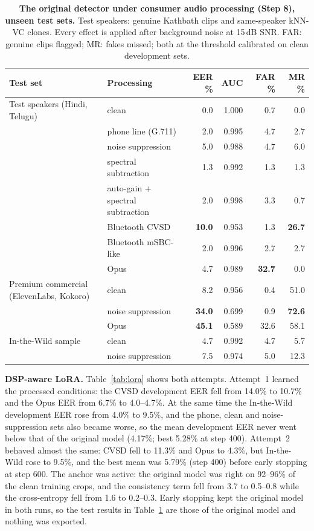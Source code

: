 \documentclass[10pt,a4paper,twocolumn]{article}
\begin{document}
\begin{table}[t]
\centering\small
\caption{\textbf{The original detector under consumer audio processing (Step 8), unseen test sets.} Test speakers: genuine Kathbath clips and same-speaker kNN-VC clones. Every effect is applied after background noise at 15\,dB SNR. FAR: genuine clips flagged; MR: fakes missed; both at the threshold calibrated on clean development sets.}
\label{tab:dsp}
\begin{tabular}{@{}llrrrr@{}}
\toprule
\textbf{Test set} & \textbf{Processing} & \textbf{EER \%} & \textbf{AUC} & \textbf{FAR \%} & \textbf{MR \%}\\
\midrule
Test speakers (Hindi, Telugu) & clean & 0.0 & 1.000 & 0.7 & 0.0\\
 & phone line (G.711) & 2.0 & 0.995 & 4.7 & 2.7\\
 & noise suppression & 5.0 & 0.988 & 4.7 & 6.0\\
 & spectral subtraction & 1.3 & 0.992 & 1.3 & 1.3\\
 & auto-gain + spectral subtraction & 2.0 & 0.998 & 3.3 & 0.7\\
 & Bluetooth CVSD & \textbf{10.0} & 0.953 & 1.3 & \textbf{26.7}\\
 & Bluetooth mSBC-like & 2.0 & 0.996 & 2.7 & 2.7\\
 & Opus & 4.7 & 0.989 & \textbf{32.7} & 0.0\\
\midrule
Premium commercial (ElevenLabs, Kokoro) & clean & 8.2 & 0.956 & 0.4 & 51.0\\
 & noise suppression & \textbf{34.0} & 0.699 & 0.9 & \textbf{72.6}\\
 & Opus & \textbf{45.1} & 0.589 & 32.6 & 58.1\\
\midrule
In-the-Wild sample & clean & 4.7 & 0.992 & 4.7 & 5.7\\
 & noise suppression & 7.5 & 0.974 & 5.0 & 12.3\\
\bottomrule
\end{tabular}
\end{table}

\textbf{DSP-aware LoRA.} Table~\ref{tab:lora} shows both attempts. Attempt~1 learned the processed conditions: the CVSD development EER fell from 14.0\% to 10.7\% and the Opus EER from 6.7\% to 4.0--4.7\%. At the same time the In-the-Wild development EER rose from 4.0\% to 9.5\%, and the phone, clean and noise-suppression sets also became worse, so the mean development EER never went below that of the original model (4.17\%; best 5.28\% at step 400). Attempt~2 behaved almost the same: CVSD fell to 11.3\% and Opus to 4.3\%, but In-the-Wild rose to 9.5\%, and the best mean was 5.79\% (step 400) before early stopping at step 600. The anchor was active: the original model was right on 92--96\% of the clean training crops, and the consistency term fell from 3.7 to 0.5--0.8 while the cross-entropy fell from 1.6 to 0.2--0.3. Early stopping kept the original model in both runs, so the test results in Table~\ref{tab:dsp} are those of the original model and nothing was exported.
\end{document}
